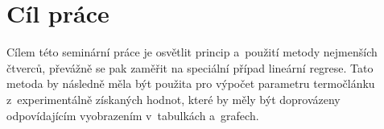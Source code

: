 \section{Cíl práce}
Cílem této seminární práce je osvětlit princip a~použití metody nejmenších
čtverců, převážně se pak zaměřit na speciální případ lineární regrese. Tato
metoda by následně měla být použita pro výpočet parametru termočlánku
z~experimentálně získaných hodnot, které by měly být doprovázeny odpovídajícím
vyobrazením v~tabulkách a~grafech. 
